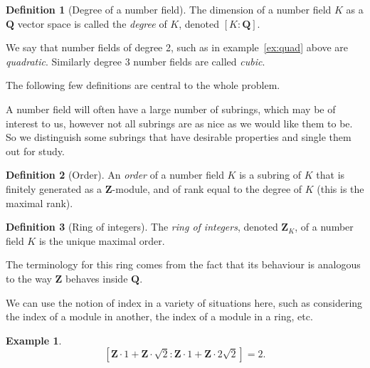 \documentclass[a4paper,abstracton,bibtotoc]{scrreprt}
\theoremstyle{definition}
\newtheorem{defn}{Definition}
\newtheorem{ex}{Example}
\newcommand{\QQ}{\mathbf{Q}}
\newcommand{\ZZ}{\mathbf{Z}}
\begin{document}
\begin{defn}[Degree of a number field]
The dimension of a number field $K$ as a $\QQ$ vector space is called the \emph{degree} of $K$, denoted $[K:\QQ]$.

We say that number fields of degree 2, such as in example~\ref{ex:quad} above are \emph{quadratic}.
Similarly degree 3 number fields are called \emph{cubic}.
\end{defn}

\minisec{}
The following few definitions are central to the whole problem.

A number field will often have a large number of subrings, which may be of interest to us, however not all subrings are as nice as we would like them to be.
So we distinguish some subrings that have desirable properties and single them out for study.

\begin{defn}[Order]
An \emph{order} of a number field $K$ is a subring of $K$ that is finitely generated as a $\ZZ$-module, and of rank equal to the degree of $K$ (this is the maximal rank).
\end{defn}


\begin{defn}[Ring of integers]
The \emph{ring of integers}, denoted $\ZZ_K$, of a number field $K$ is the unique maximal order.
\end{defn}

The terminology for this ring comes from the fact that its behaviour is analogous to the way $\ZZ$ behaves inside $\QQ$.

We can use the notion of index in a variety of situations here, such as considering the index of a module in another, the index of a module in a ring, etc. %

\begin{ex}
\[
[\ZZ\cdot 1 + \ZZ\cdot \sqrt{2} : \ZZ \cdot 1 + \ZZ \cdot 2\sqrt{2}] = 2.
\]
\end{ex}
\end{document}
